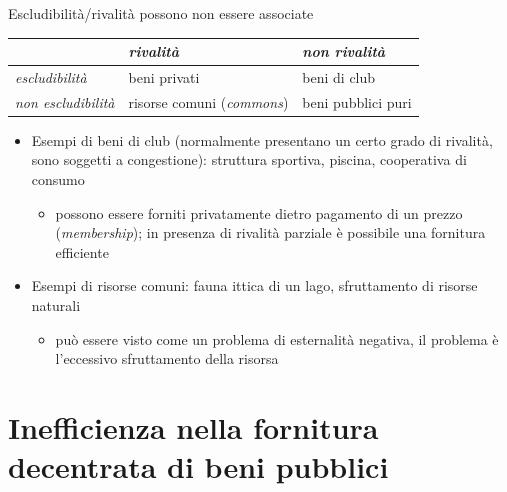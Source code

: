 \documentclass[aspectratio=64,11pt]{beamer}
\begin{document}
\begin{frame}{Escludibilità/rivalità possono non essere associate}
\begin{center}
\begin{tabular}{lll}
\toprule
 & \emph{rivalità} & \emph{non rivalità}\\[0pt]
\midrule
\emph{escludibilità} & beni privati & beni di club\\[0pt]
\emph{non escludibilità} & risorse comuni (\emph{commons}) & beni pubblici puri\\[0pt]
\bottomrule
\end{tabular}
\end{center}

\begin{itemize}
\item Esempi di beni di club (normalmente presentano un certo grado di rivalità, sono soggetti a congestione): struttura sportiva, piscina, cooperativa di consumo
\begin{itemize}
\item possono essere forniti privatamente dietro pagamento di un prezzo (\emph{membership}); in presenza di rivalità parziale è possibile una fornitura efficiente
\end{itemize}
\item Esempi di risorse comuni: fauna ittica di un lago, sfruttamento di risorse naturali
\begin{itemize}
\item può essere visto come un problema di esternalità negativa, il problema è l'eccessivo sfruttamento della risorsa
\end{itemize}
\end{itemize}
\end{frame}

\section{Inefficienza nella fornitura decentrata di beni pubblici}
\end{document}
